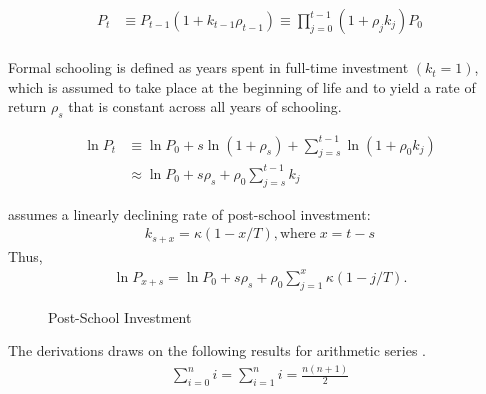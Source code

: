 \begin{frame}
\begin{align*}
P_t & \equiv P_{t - 1} (1 + k_{t - 1} \rho_{t - 1}) \equiv \prod^{t - 1}_{j= 0} (1 + \rho_jk_j)P_0 \\
\end{align*}
\end{frame}
\begin{frame}
Formal schooling is defined as years spent in full-time investment $(k_t = 1)$, which is assumed to take place at the beginning of life and to yield a rate of return $\rho_s$ that is constant across all years of schooling.

\begin{align*}
\ln{P_t} & \equiv \ln{P_0}  + s \ln{(1 + \rho_s)} + \sum^{t-1}_{j=s} \ln{(1 + \rho_0 k_j)} \\
& \approx  \ln{P_0} + s \rho_s + \rho_0 \sum^{t - 1}_{j=s} k_j
\end{align*}
\end{frame}
\begin{frame}
 assumes a linearly declining rate of post-school investment:
\begin{align*}
k_{s + x} = \kappa\left( 1 - x/T\right), \text{where}\; x = t - s
\end{align*}
Thus,
\begin{align*}
\ln{P_{x+s}} = \ln{P_0} + s \rho_s + \rho_0 \sum_{j=1}^{x} \kappa \left(1 - j/T\right).
\end{align*}
\end{frame}
\begin{frame}
\begin{figure}[htp]\centering
\caption{Post-School Investment}
\end{figure}
\end{frame}
\begin{frame}
The derivations draws on the following results for arithmetic series \cite{Chapman.2018}.
\begin{align*}
\sum^n_{i = 0} i = \sum^n_{i = 1} i = \frac{n(n + 1)}{2}
\end{align*}
\end{frame}

